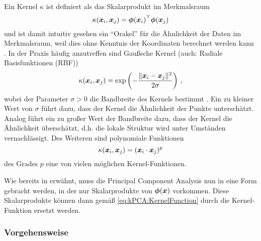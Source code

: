 Ein Kernel $\kappa$ ist definiert als das Skalarprodukt im Merkmalsraum \parencite[34]{ShaweTaylor.2011}
\begin{equation}
	\label{eq:kPCA:KernelFunction}
	\kappa(\bm{x}_i, \bm{x}_j) = \bm{\phi}(\bm{x}_i)^\top \bm{\phi}(\bm{x}_j)
\end{equation}
und ist damit intuitiv gesehen ein \enquote{Orakel} für die Ähnlichkeit der Daten im Merkmalsraum, weil dies ohne Kenntnis der Koordinaten berechnet werden kann \parencite[71]{ShaweTaylor.2011}. In der Praxis häufig anzutreffen sind Gaußsche Kernel (auch: Radiale
Basisfunktionen (RBF))
\begin{equation}
	\kappa(\bm{x}_i, \bm{x}_j) = \exp \left(- \frac{\lVert \bm{x}_i - \bm{x}_j\rVert^2}{2\sigma}\right) \, ,
\end{equation}
wobei der Parameter $\sigma > 0$ die Bandbreite des Kernels bestimmt \parencite[296]{ShaweTaylor.2011}. Ein zu kleiner Wert von $\sigma$ führt dazu, dass der Kernel die
Ähnlichkeit der Punkte unterschätzt. Analog führt ein zu großer Wert der Bandbreite dazu, dass der
Kernel die Ähnlichkeit überschätzt, d.h. die lokale Struktur wird unter Umständen vernachlässigt.
Des Weiteren sind polynomiale Funktionen \parencite[292]{ShaweTaylor.2011}
\begin{equation}
	\kappa(\bm{x}_i, \bm{x}_j) = (\bm{x}_i \cdot \bm{x}_j)^p
\end{equation}
des Grades $p$ eine von vielen möglichen Kernel-Funktionen.

Wie bereits in  erwähnt, muss die
Principal Component Analysis nun in eine Form gebracht werden, in der nur Skalarprodukte von
$\bm{\phi}(\bm{x})$ vorkommen. Diese Skalarprodukte können dann gemäß
\eqref{eq:kPCA:KernelFunction} durch die Kernel-Funktion ersetzt werden.

\subsubsection{Vorgehensweise}
\label{ch:MethodenDerDimRed:statistisch:kPCA:Vorgehensweise}

